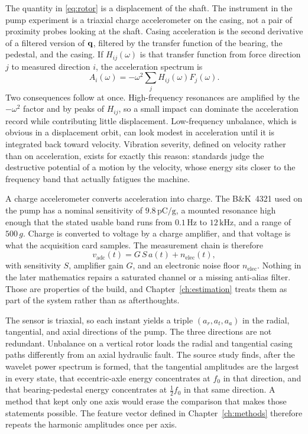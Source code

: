 The quantity in \eqref{eq:rotor} is a displacement of the shaft.
The instrument in the pump experiment is a triaxial charge accelerometer on the casing, not a pair of proximity probes looking at the shaft.
Casing acceleration is the second derivative of a filtered version of \(\mathbf{q}\), filtered by the transfer function of the bearing, the pedestal, and the casing.
If \(H_{ij}(\omega)\) is that transfer function from force direction \(j\) to measured direction \(i\), the acceleration spectrum is
\begin{equation}
A_{i}(\omega)=-\omega^{2}\sum_{j} H_{ij}(\omega) F_{j}(\omega).
\label{eq:transfer}
\end{equation}
Two consequences follow at once.
High-frequency resonances are amplified by the \(-\omega^{2}\) factor and by peaks of \(H_{ij}\), so a small impact can dominate the acceleration record while contributing little displacement.
Low-frequency unbalance, which is obvious in a displacement orbit, can look modest in acceleration until it is integrated back toward velocity.
Vibration severity, defined on velocity rather than on acceleration, exists for exactly this reason: standards judge the destructive potential of a motion by the velocity, whose energy sits closer to the frequency band that actually fatigues the machine.

A charge accelerometer converts acceleration into charge.
The B\&K~4321 used on the pump has a nominal sensitivity of \(9.8\,\mathrm{pC/g}\), a mounted resonance high enough that the stated usable band runs from \(0.1\,\mathrm{Hz}\) to \(12\,\mathrm{kHz}\), and a range of \(500\,g\).
Charge is converted to voltage by a charge amplifier, and that voltage is what the acquisition card samples.
The measurement chain is therefore
\begin{equation}
v_{\mathrm{adc}}(t)=G\,S\,a(t)+n_{\mathrm{elec}}(t),
\label{eq:chain}
\end{equation}
with sensitivity \(S\), amplifier gain \(G\), and an electronic noise floor \(n_{\mathrm{elec}}\).
Nothing in the later mathematics repairs a saturated channel or a missing anti-alias filter.
Those are properties of the build, and Chapter~\ref{ch:estimation} treats them as part of the system rather than as afterthoughts.

The sensor is triaxial, so each instant yields a triple \((a_{r}, a_{t}, a_{a})\) in the radial, tangential, and axial directions of the pump.
The three directions are not redundant.
Unbalance on a vertical rotor loads the radial and tangential casing paths differently from an axial hydraulic fault.
The source study finds, after the wavelet power spectrum is formed, that the tangential amplitudes are the largest in every state, that eccentric-axle energy concentrates at \(f_0\) in that direction, and that bearing-pedestal energy concentrates at \(\tfrac12 f_0\) in that same direction.
A method that kept only one axis would erase the comparison that makes those statements possible.
The feature vector defined in Chapter~\ref{ch:methods} therefore repeats the harmonic amplitudes once per axis.

